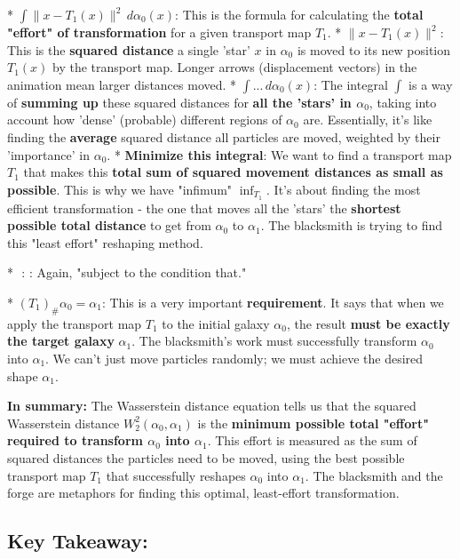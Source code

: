 \documentclass{article}
\begin{document}
*   \textbf{\( \int \|x - T_1(x)\|^2 \, d\alpha_0(x) \)}:  This is the formula for calculating the \textbf{total "effort" of transformation} for a given transport map \( T_1 \).
    *   \textbf{\( \|x - T_1(x)\|^2 \)}: This is the \textbf{squared distance} a single 'star' \( x \) in \( \alpha_0 \) is moved to its new position \( T_1(x) \) by the transport map. Longer arrows (displacement vectors) in the animation mean larger distances moved.
    *   \textbf{\( \int ... \, d\alpha_0(x) \)}: The integral \( \int \) is a way of \textbf{summing up} these squared distances for \textbf{all the 'stars' in \( \alpha_0 \)}, taking into account how 'dense' (probable) different regions of \( \alpha_0 \) are.  Essentially, it's like finding the \textbf{average} squared distance all particles are moved, weighted by their 'importance' in \( \alpha_0 \).
    *   \textbf{Minimize this integral}: We want to find a transport map \( T_1 \) that makes this \textbf{total sum of squared movement distances as small as possible}.  This is why we have "infimum" \( \inf_{T_1} \).  It's about finding the most efficient transformation - the one that moves all the 'stars' the \textbf{shortest possible total distance} to get from \( \alpha_0 \) to \( \alpha_1 \).  The blacksmith is trying to find this "least effort" reshaping method.

*   \textbf{\( \text{ : } \)}: Again, "subject to the condition that."

*   \textbf{\( (T_1)_\# \alpha_0 = \alpha_1 \)}:  This is a very important \textbf{requirement}. It says that when we apply the transport map \( T_1 \) to the initial galaxy \( \alpha_0 \), the result \textbf{must be exactly the target galaxy} \( \alpha_1 \).  The blacksmith's work must successfully transform \( \alpha_0 \) into \( \alpha_1 \).  We can't just move particles randomly; we must achieve the desired shape \( \alpha_1 \).

\textbf{In summary:}  The Wasserstein distance equation tells us that the squared Wasserstein distance \( W_2^2(\alpha_0, \alpha_1) \) is the \textbf{minimum possible total "effort" required to transform \( \alpha_0 \) into \( \alpha_1 \)}.  This effort is measured as the sum of squared distances the particles need to be moved, using the best possible transport map \( T_1 \) that successfully reshapes \( \alpha_0 \) into \( \alpha_1 \). The blacksmith and the forge are metaphors for finding this optimal, least-effort transformation.

\subsection*{Key Takeaway:}
\end{document}
